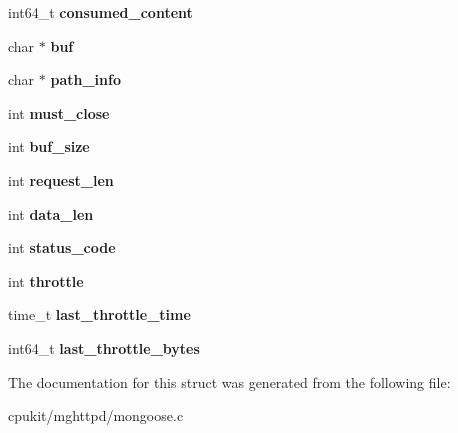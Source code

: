 \begin{DoxyCompactItemize}
int64\+\_\+t {\bfseries consumed\+\_\+content}
\item 
\mbox{\label{structmg__connection_a897c2cf854e4ad76856bad74fb8e7f0a}} 
char $\ast$ {\bfseries buf}
\item 
\mbox{\label{structmg__connection_a450fa6c33039516685824a5f7fbdcec5}} 
char $\ast$ {\bfseries path\+\_\+info}
\item 
\mbox{\label{structmg__connection_a7e246b550026933deb3bbcda123df48f}} 
int {\bfseries must\+\_\+close}
\item 
\mbox{\label{structmg__connection_a6033a47c6e89ad571ca65000ab53f07e}} 
int {\bfseries buf\+\_\+size}
\item 
\mbox{\label{structmg__connection_a31dff43ab95d3d5e6dde9eb95460fd97}} 
int {\bfseries request\+\_\+len}
\item 
\mbox{\label{structmg__connection_aa88754208d93c23d110469696d935bdc}} 
int {\bfseries data\+\_\+len}
\item 
\mbox{\label{structmg__connection_ae0163f2496aed16dc972e2139b66bb93}} 
int {\bfseries status\+\_\+code}
\item 
\mbox{\label{structmg__connection_a1253d8e7156cefe37debd0c1aa2b3769}} 
int {\bfseries throttle}
\item 
\mbox{\label{structmg__connection_a0514c4ba89ab66306fa4c44186593437}} 
time\+\_\+t {\bfseries last\+\_\+throttle\+\_\+time}
\item 
\mbox{\label{structmg__connection_abd0446f17c7497539e9724df2007655f}} 
int64\+\_\+t {\bfseries last\+\_\+throttle\+\_\+bytes}
\end{DoxyCompactItemize}


The documentation for this struct was generated from the following file\+:\begin{DoxyCompactItemize}
\item 
cpukit/mghttpd/mongoose.\+c\end{DoxyCompactItemize}
